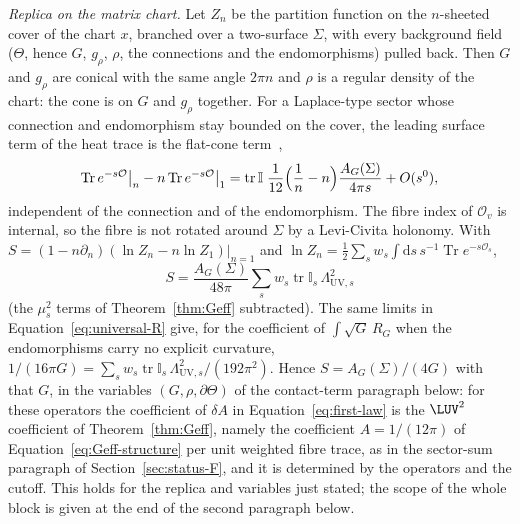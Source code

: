\emph{Replica on the matrix chart.} Let \(Z_n\) be the partition function on the \(n\)-sheeted cover of the chart \(x\), branched over a two-surface \(\Sigma\), with every background field (\(\Theta\), hence \(G\), \(g_\rho\), \(\rho\), the connections and the endomorphisms) pulled back. Then \(G\) and \(g_\rho\) are conical with the same angle \(2\pi n\) and \(\rho\) is a regular density of the chart: the cone is on \(G\) and \(g_\rho\) together. For a Laplace-type sector whose connection and endomorphism stay bounded on the cover, the leading surface term of the heat trace is the flat-cone term~\cite{Solodukhin2011},
\[
  \operatorname{Tr}e^{-s\mathcal O}\big|_n-n\operatorname{Tr}e^{-s\mathcal O}\big|_1
  =\operatorname{tr}\mathbb I\;\frac1{12}\Bigl(\frac1n-n\Bigr)\frac{A_G(\Sigma)}{4\pi s}+O(s^0),
\]
independent of the connection and of the endomorphism. The fibre index of \(\mathcal O_v\) is internal, so the fibre is not rotated around \(\Sigma\) by a Levi-Civita holonomy. With \(S=(1-n\partial_n)(\ln Z_n-n\ln Z_1)|_{n=1}\) and \(\ln Z_n=\tfrac12\sum_sw_s\int\mathrm{d}s\,s^{-1}\operatorname{Tr}e^{-s\mathcal O_s}\),
\[
  S=\frac{A_G(\Sigma)}{48\pi}\sum_sw_s\operatorname{tr}\mathbb I_s\,\Lambda_{\mathrm{UV},s}^2
\]
(the \(\mu_s^2\) terms of Theorem~\ref{thm:Geff} subtracted). The same limits in Equation~\eqref{eq:universal-R} give, for the coefficient of \(\int\sqrt{G}\,R_G\) when the endomorphisms carry no explicit curvature, \(1/(16\pi G)=\sum_sw_s\operatorname{tr}\mathbb I_s\,\Lambda_{\mathrm{UV},s}^2/(192\pi^2)\). Hence \(S=A_G(\Sigma)/(4G)\) with that \(G\), in the variables \((G,\rho,\partial\Theta)\) of the contact-term paragraph below: for these operators the coefficient of \(\delta A\) in Equation~\eqref{eq:first-law} is the \(\LUV^2\) coefficient of Theorem~\ref{thm:Geff}, namely the coefficient \(A=1/(12\pi)\) of Equation~\eqref{eq:Geff-structure} per unit weighted fibre trace, as in the sector-sum paragraph of Section~\ref{sec:status-F}, and it is determined by the operators and the cutoff. This holds for the replica and variables just stated; the scope of the whole block is given at the end of the second paragraph below.

